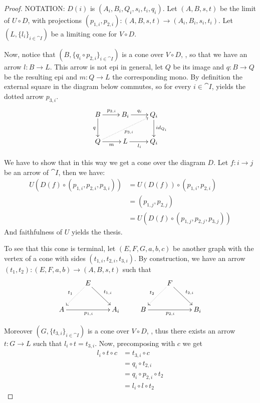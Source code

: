 \begin{proof} 
	NOTATION: $D(i)$ is $(A_i, B_i, Q_i, s_i, t_i, q_i)$.	Let $(A, B, s, t)$ be the limit of $U\circ D$, with projections $(p_{1,i}, p_{2,i})\colon (A,B, s,t)\to (A_i, B_i, s_i, t_i)$. Let $(L, \{l_i\}_{i\in \cat{I}})$ be a limiting cone for $V\circ D$. 
	
	Now, notice that $(B, \{q_i\circ p_{2,i}\}_{i\in \cat{I}})$ is a cone over $V\circ D$, , so that we have an arrow $l\colon B\to L$. This arrow is not epi in general, let $Q$ be its image and $q\colon B\to Q$ be the resulting epi and $m\colon Q\to L$ the corresponding mono.
	By definition the external square in the diagram below commutes, so for every $i\in \cat{I}$,  yields the dotted arrow $p_{3,i}$.
	\[\xymatrix{B \ar[r]^{p_{2,i}} \ar[d]_{q}& B_i \ar[r]^{q_i} & Q_i \ar[d]^{id_{Q_i}}\\ Q \ar[r]_{m} \ar@{.>}[urr]_{p_{3,i}}& L \ar[r]_{l_i} & Q_i}\]
	
	We have to show that in this way we get a cone over the diagram $D$. Let $f\colon i\to j$ be an arrow of $\cat{I}$, then we have:
	\begin{align*}
	U(D(f)\circ (p_{1,i}, p_{2, i}, p_{3,i}))  &=  U(D(f))\circ(p_{1,i}, p_{2, i})\\
                                                   &=  (p_{1,j}, p_{2, j})\\
                                                   &=  U(D(f)\circ (p_{1,j}, p_{2, j}, p_{3,j}))
	\end{align*}
	 And faithfulness of $U$ yields the thesis.
	 
	 To see that this cone is terminal, let $(E, F, G, a, b, c)$ be another graph with the vertex of a cone with sides $(t_{1,i},t_{2, i}, t_{3,i})$. By construction, we have an arrow $(t_1, t_2)\colon (E, F, a, b)\to (A, B, s, t)$ such that
	 \[\xymatrix{&E \ar@{.>}[dl]_{t_1} \ar[dr]^{t_{1,i}}&&&F \ar@{.>}[dl]_{t_2} \ar[dr]^{t_{2,i}}\\ A \ar[rr]_{p_{1,i}} & & A_i & B \ar[rr]_{p_{2,i}}&& B_i }\]
	
        Moreover $(G, \{t_{3,i}\}_{i\in \cat{I}})$ is a cone over $V\circ D$, , thus there exists an arrow $t\colon G\to L$ such that $l_i\circ t =t_{3,i}$. Now, precomposing with $c$ we get
	\begin{align*}
		l_i\circ t\circ c&=t_{3,i}\circ c\\&=q_i\circ t_{2,i}\\&=q_i\circ p_{2,i}\circ t_2\\&=l_i\circ l\circ t_2
	\end{align*} 
	

\end{proof}
